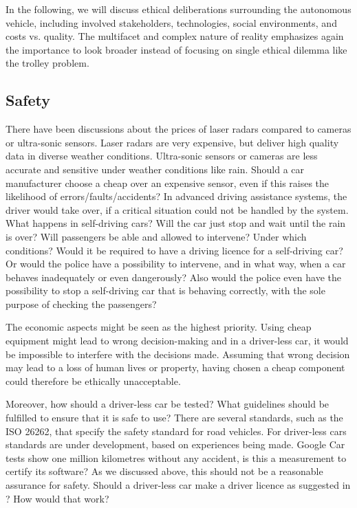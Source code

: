 In the following, we will discuss ethical deliberations surrounding the autonomous vehicle, including involved stakeholders, technologies, social environments, and costs vs. quality. The multifacet and complex nature of reality emphasizes again the importance to look broader instead of focusing on single ethical dilemma like the trolley problem.

\subsection{Safety}
\label{sec:EAofTC:Safety}

There have been discussions about the prices of laser radars compared to cameras or ultra-sonic sensors. Laser radars are very expensive, but deliver high quality data in diverse weather conditions. Ultra-sonic sensors or cameras are less accurate and sensitive under weather conditions like rain. 
Should a car manufacturer choose a cheap over an expensive sensor, even if this raises the likelihood of errors/faults/accidents? In advanced driving assistance systems, the driver would take over, if a critical situation could not be handled by the system. What happens in self-driving cars? Will the car just stop and wait until the rain is over? Will passengers be able and allowed to intervene? Under which conditions? Would it be required to have a driving licence for a self-driving car? Or would the police have a possibility to intervene, and in what way, when a car behaves inadequately or even dangerously? Also would the police even have the possibility to stop a self-driving car that is behaving correctly, with the sole purpose of checking the passengers?

The economic aspects might be seen as the highest priority. Using cheap equipment might lead to wrong decision-making and in a driver-less car, it would be impossible to interfere with the decisions made. Assuming that wrong decision may lead to a loss of human lives or property, having chosen a cheap component could therefore be ethically unacceptable.

Moreover, how should a driver-less car be tested? What guidelines should be fulfilled to ensure that it is safe to use? There are several standards, such as the ISO 26262, that specify the safety standard for road vehicles. For driver-less cars standards are under development, based on experiences being made. 
Google Car tests show one million kilometres without any accident, is this a measurement to certify its software? As we discussed above, this should not be a reasonable assurance for safety. Should a driver-less car make a driver licence as suggested in \cite{McBride:2016:EDC:2874239.2874265}? How would that work? 

